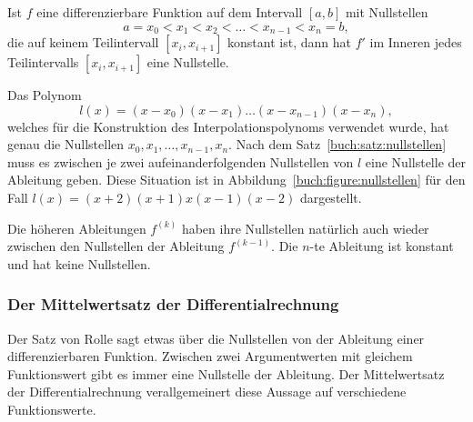 \begin{satz}
\label{buch:satz:nullstellen}
Ist $f$ eine differenzierbare Funktion auf dem Intervall $[a,b]$
mit Nullstellen 
\[
a=x_0 < x_1 < x_2 < \dots < x_{n-1} < x_n = b,
\]
die auf keinem Teilintervall $[x_i,x_{i+1}]$ konstant ist,
dann hat $f'$ im Inneren jedes Teilintervalls $[x_i, x_{i+1}]$
eine Nullstelle.
\end{satz}

Das Polynom 
\[
l(x) = (x-x_0)(x-x_1)\dots (x-x_{n-1})(x-x_n),
\]
welches für die Konstruktion des Interpolationspolynoms verwendet
wurde, hat genau die Nullstellen $x_0,x_1,\dots,x_{n-1},x_n$.
Nach dem Satz~\ref{buch:satz:nullstellen} muss es zwischen je
zwei aufeinanderfolgenden Nullstellen von $l$ eine Nullstelle der
Ableitung geben. 
Diese Situation ist in Abbildung~\ref{buch:figure:nullstellen}
für den Fall $l(x)=(x+2)(x+1)x(x-1)(x-2)$ dargestellt.

Die höheren Ableitungen $f^{(k)}$ haben ihre Nullstellen
natürlich auch wieder zwischen den Nullstellen der Ableitung $f^{(k-1)}$.
Die $n$-te Ableitung ist konstant und hat keine Nullstellen.


\subsubsection{Der Mittelwertsatz der Differentialrechnung}
Der Satz von Rolle sagt etwas über die Nullstellen von der Ableitung
einer differenzierbaren Funktion.
Zwischen zwei Argumentwerten mit gleichem Funktionswert gibt es immer
eine Nullstelle der Ableitung.
Der Mittelwertsatz der Differentialrechnung verallgemeinert diese
Aussage auf verschiedene Funktionswerte.

